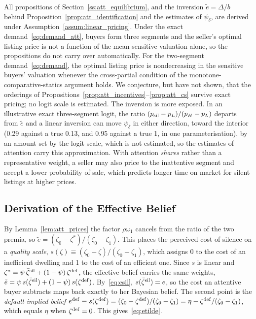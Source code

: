 All propositions of Section~\ref{ss:att_equilibrium}, and the inversion $\tilde e=\Delta/b$ behind Proposition~\ref{prop:att_identification} and the estimates of $\psi_\delta$, are derived under Assumption~\ref{assum:linear_pricing}. Under the exact demand~\eqref{eq:demand_att}, buyers form three segments and the seller's optimal listing price is not a function of the mean sensitive valuation alone, so the propositions do not carry over automatically. For the two-segment demand~\eqref{eq:demand}, the optimal listing price is nondecreasing in the sensitive buyers' valuation whenever the cross-partial condition of the monotone-comparative-statics argument holds. We conjecture, but have not shown, that the orderings of Propositions~\ref{prop:att_incentives}--\ref{prop:att_cs} survive exact pricing; no logit scale is estimated. The inversion is more exposed. In an illustrative exact three-segment logit, the ratio $(p_{\rm sil}-p_L)/(p_H-p_L)$ departs from $\tilde e$ and a linear inversion can move $\psi_\delta$ in either direction, toward the interior (0.29 against a true 0.13, and 0.95 against a true 1, in one parameterisation), by an amount set by the logit scale, which is not estimated, so the estimates of attention carry this approximation. With attention \emph{shares} rather than a representative weight, a seller may also price to the inattentive segment and accept a lower probability of sale, which predicts longer time on market for silent listings at higher prices.

\subsection*{Derivation of the Effective Belief}
\label{app:att_etilde}

By Lemma~\ref{lem:att_prices} the factor $\rho\omega_1$ cancels from the ratio of the two premia, so $\tilde e=(\zeta_0-\zeta^*)/(\zeta_0-\zeta_1)$. This places the perceived cost of silence on a \emph{quality scale}, $s(\zeta)\equiv(\zeta_0-\zeta)/(\zeta_0-\zeta_1)$, which assigns 0 to the cost of an inefficient dwelling and 1 to the cost of an efficient one. Since $s$ is linear and $\zeta^*=\psi\,\bar \zeta^{\rm sil}+(1-\psi)\,\zeta^{\rm def}$, the effective belief carries the same weights, $\tilde e=\psi\,s(\bar \zeta^{\rm sil})+(1-\psi)\,s(\zeta^{\rm def})$. By~\eqref{eq:csil}, $s(\bar \zeta^{\rm sil})=e$, so the cost an attentive buyer subtracts maps back exactly to her Bayesian belief. The second point is the \emph{default-implied belief} $e^{\rm def}\equiv s(\zeta^{\rm def})=(\zeta_0-\zeta^{\rm def})/(\zeta_0-\zeta_1)=\eta-\zeta^{\rm def}/(\zeta_0-\zeta_1)$, which equals $\eta$ when $\zeta^{\rm def}=0$. This gives~\eqref{eq:etilde}.

